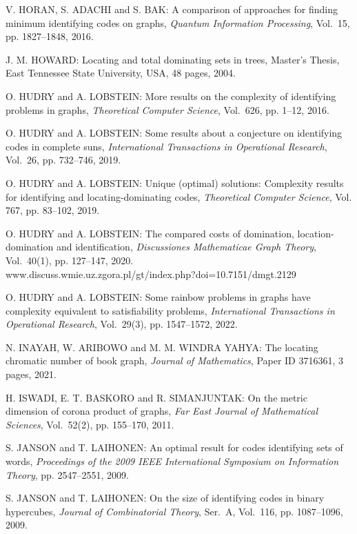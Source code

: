 \begin{thebibliography}{999}
V. HORAN, S. ADACHI and S. BAK: A comparison of approaches for finding minimum identifying codes on graphs, {\it Quantum Information Processing}, Vol.~15, pp. 1827--1848, 2016.

J. M. HOWARD: Locating and total dominating sets in trees, Master's Thesis, East Tennessee State University, USA, 48 pages, 2004.

O. HUDRY and A. LOBSTEIN: More results on the complexity of identifying problems in graphs, {\it Theoretical Computer Science}, Vol.~626, pp. 1--12, 2016.

O. HUDRY and A. LOBSTEIN: Some results about a conjecture on identifying codes in complete suns, {\it International Transactions in Operational Research}, Vol.~26, pp. 732--746, 2019.

O. HUDRY and A. LOBSTEIN: Unique (optimal) solutions: Complexity results for identifying and locating-dominating codes, {\it Theoretical Computer Science}, Vol. 767, pp. 83--102, 2019.%

O. HUDRY and A. LOBSTEIN: The compared costs of domination, location-domination and identification, {\it Discussiones Mathematicae Graph Theory}, Vol.~40(1), pp. 127--147, 2020.\\
www.discuss.wmie.uz.zgora.pl/gt/index.php?doi=10.7151/dmgt.2129%

O. HUDRY and A. LOBSTEIN: Some rainbow problems in graphs have complexity equivalent to satisfiability problems, {\it International Transactions in Operational Research}, Vol.~29(3), pp. 1547--1572, 2022.
  
N. INAYAH, W. ARIBOWO and M. M. WINDRA YAHYA: The locating chromatic number of book graph, {\it Journal of Mathematics}, Paper ID 3716361, 3 pages, 2021.

H. ISWADI, E. T. BASKORO and R. SIMANJUNTAK: On the metric dimension of corona product of graphs, {\it Far East Journal of Mathematical Sciences}, Vol.~52(2), pp. 155--170, 2011.   

S. JANSON and T. LAIHONEN: An optimal result for codes identifying sets of words, {\it Proceedings of the 2009 IEEE International Symposium on Information Theory}, pp. 2547--2551, 2009.

S. JANSON and T. LAIHONEN: On the size of identifying codes in binary hypercubes, {\it Journal of Combinatorial Theory}, Ser.~A, Vol.~116, pp. 1087--1096, 2009.


\end{thebibliography}
